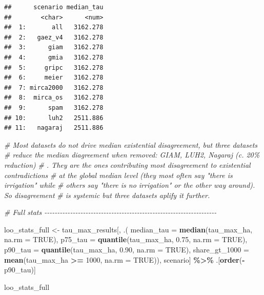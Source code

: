 \documentclass[
  11pt,
]{article}
\newenvironment{Shaded}{\begin{snugshade}}{\end{snugshade}}
\newcommand{\AttributeTok}[1]{\textcolor[rgb]{0.13,0.29,0.53}{#1}}
\newcommand{\CommentTok}[1]{\textcolor[rgb]{0.56,0.35,0.01}{\textit{#1}}}
\newcommand{\ConstantTok}[1]{\textcolor[rgb]{0.56,0.35,0.01}{#1}}
\newcommand{\DecValTok}[1]{\textcolor[rgb]{0.00,0.00,0.81}{#1}}
\newcommand{\FloatTok}[1]{\textcolor[rgb]{0.00,0.00,0.81}{#1}}
\newcommand{\FunctionTok}[1]{\textcolor[rgb]{0.13,0.29,0.53}{\textbf{#1}}}
\newcommand{\NormalTok}[1]{#1}
\newcommand{\OtherTok}[1]{\textcolor[rgb]{0.56,0.35,0.01}{#1}}
\newcommand{\SpecialCharTok}[1]{\textcolor[rgb]{0.81,0.36,0.00}{\textbf{#1}}}
\begin{document}
\begin{verbatim}
##      scenario median_tau
##        <char>      <num>
##  1:       all   3162.278
##  2:   gaez_v4   3162.278
##  3:      giam   3162.278
##  4:      gmia   3162.278
##  5:     gripc   3162.278
##  6:     meier   3162.278
##  7: mirca2000   3162.278
##  8:  mirca_os   3162.278
##  9:      spam   3162.278
## 10:      luh2   2511.886
## 11:   nagaraj   2511.886
\end{verbatim}

\begin{Shaded}
\begin{Highlighting}[]
\CommentTok{\# Most datasets do not drive median existential disagreement, but three datasets}
\CommentTok{\# reduce the median diagreement when removed: GIAM, LUH2, Nagaraj (c. 20\% reduction)}
\CommentTok{\# . They are the ones contributing most disagreement to existential contradictions}
\CommentTok{\# at the global median level (they most often say "there is irrigation" while}
\CommentTok{\# others say "there is no irrigation" or the other way around). So disagreement}
\CommentTok{\# is systemic but three datasets aplify it further.}

\CommentTok{\# Full stats {-}{-}{-}{-}{-}{-}{-}{-}{-}{-}{-}{-}{-}{-}{-}{-}{-}{-}{-}{-}{-}{-}{-}{-}{-}{-}{-}{-}{-}{-}{-}{-}{-}{-}{-}{-}{-}{-}{-}{-}{-}{-}{-}{-}{-}{-}{-}{-}{-}{-}{-}{-}{-}{-}{-}{-}{-}{-}{-}{-}{-}{-}{-}{-}{-}{-}{-}}

\NormalTok{loo\_stats\_full }\OtherTok{\textless{}{-}}\NormalTok{ tau\_max\_results[, .(}
    \AttributeTok{median\_tau =} \FunctionTok{median}\NormalTok{(tau\_max\_ha, }\AttributeTok{na.rm =} \ConstantTok{TRUE}\NormalTok{),}
    \AttributeTok{p75\_tau =} \FunctionTok{quantile}\NormalTok{(tau\_max\_ha, }\FloatTok{0.75}\NormalTok{, }\AttributeTok{na.rm =} \ConstantTok{TRUE}\NormalTok{),}
    \AttributeTok{p90\_tau =} \FunctionTok{quantile}\NormalTok{(tau\_max\_ha, }\FloatTok{0.90}\NormalTok{, }\AttributeTok{na.rm =} \ConstantTok{TRUE}\NormalTok{),}
    \AttributeTok{share\_gt\_1000 =} \FunctionTok{mean}\NormalTok{(tau\_max\_ha }\SpecialCharTok{\textgreater{}=} \DecValTok{1000}\NormalTok{, }\AttributeTok{na.rm =} \ConstantTok{TRUE}\NormalTok{)),}
\NormalTok{    scenario] }\SpecialCharTok{\%\textgreater{}\%}
\NormalTok{  .[}\FunctionTok{order}\NormalTok{(}\SpecialCharTok{{-}}\NormalTok{p90\_tau)]}

\NormalTok{loo\_stats\_full}
\end{Highlighting}
\end{Shaded}
\end{document}
